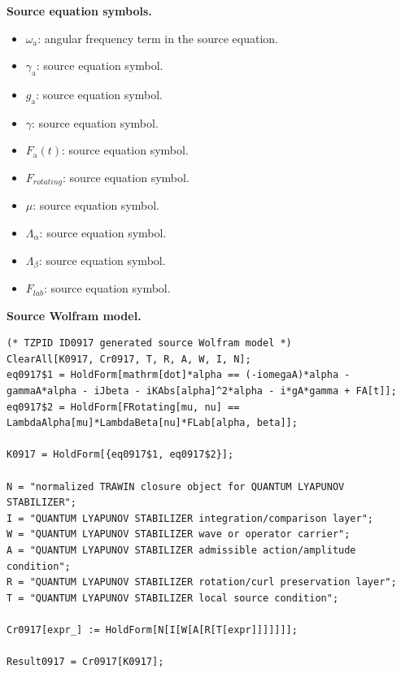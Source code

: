 \begin{minipage}[t]{0.49\linewidth}
\begingroup
\small
\raggedright
\textbf{Source equation symbols.}\par
\begin{itemize}[leftmargin=1.35em,itemsep=1pt,topsep=1pt,parsep=0pt]
    \item $\omega_{\mathrm{a}}$: angular frequency term in the source equation.
    \item $\gamma_{\mathrm{a}}$: source equation symbol.
    \item $g_{\mathrm{a}}$: source equation symbol.
    \item $\gamma$: source equation symbol.
    \item $F_{\mathrm{a}}(t)$: source equation symbol.
    \item $F_{rotating}$: source equation symbol.
    \item $\mu$: source equation symbol.
    \item $\Lambda_{\alpha}$: source equation symbol.
    \item $\Lambda_{\beta}$: source equation symbol.
    \item $F_{lab}$: source equation symbol.
\end{itemize}
\endgroup
\end{minipage}\hfill
\begin{minipage}[t]{0.47\linewidth}
\begingroup
\scriptsize
\raggedright
\textbf{Source Wolfram model.}\par
\begin{Verbatim}[fontsize=\tiny,breaklines=true,breakanywhere=true]
(* TZPID ID0917 generated source Wolfram model *)
ClearAll[K0917, Cr0917, T, R, A, W, I, N];
eq0917$1 = HoldForm[mathrm[dot]*alpha == (-iomegaA)*alpha - gammaA*alpha - iJbeta - iKAbs[alpha]^2*alpha - i*gA*gamma + FA[t]];
eq0917$2 = HoldForm[FRotating[mu, nu] == LambdaAlpha[mu]*LambdaBeta[nu]*FLab[alpha, beta]];

K0917 = HoldForm[{eq0917$1, eq0917$2}];

N = "normalized TRAWIN closure object for QUANTUM LYAPUNOV STABILIZER";
I = "QUANTUM LYAPUNOV STABILIZER integration/comparison layer";
W = "QUANTUM LYAPUNOV STABILIZER wave or operator carrier";
A = "QUANTUM LYAPUNOV STABILIZER admissible action/amplitude condition";
R = "QUANTUM LYAPUNOV STABILIZER rotation/curl preservation layer";
T = "QUANTUM LYAPUNOV STABILIZER local source condition";

Cr0917[expr_] := HoldForm[N[I[W[A[R[T[expr]]]]]]];

Result0917 = Cr0917[K0917];
\end{Verbatim}
\endgroup
\end{minipage}


